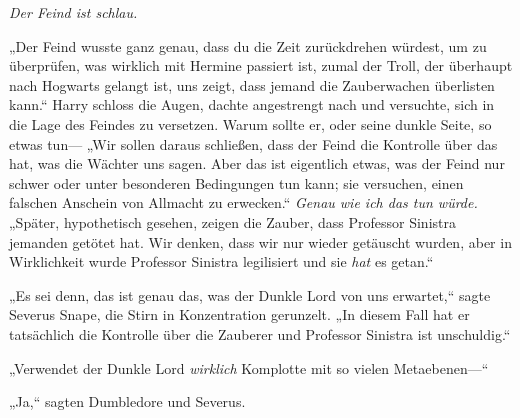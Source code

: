 \emph{Der Feind ist schlau.}

„Der Feind wusste ganz genau, dass du die Zeit zurückdrehen würdest, um zu überprüfen, was wirklich mit Hermine passiert ist, zumal der Troll, der überhaupt nach Hogwarts gelangt ist, uns zeigt, dass jemand die Zauberwachen überlisten kann.“ Harry schloss die Augen, dachte angestrengt nach und versuchte, sich in die Lage des Feindes zu versetzen.
Warum sollte er, oder seine dunkle Seite, so etwas tun—
„Wir sollen daraus schließen, dass der Feind die Kontrolle über das hat, was die Wächter uns sagen. Aber das ist eigentlich etwas, was der Feind nur schwer oder unter besonderen Bedingungen tun kann; sie versuchen, einen falschen Anschein von Allmacht zu erwecken.“
\emph{Genau wie ich das tun würde.}
„Später, hypothetisch gesehen, zeigen die Zauber, dass Professor Sinistra jemanden getötet hat. Wir denken, dass wir nur wieder getäuscht wurden, aber in Wirklichkeit wurde Professor Sinistra legilisiert und sie \emph{hat} es getan.“

„Es sei denn, das ist genau das, was der Dunkle Lord von uns erwartet,“ sagte Severus Snape, die Stirn in Konzentration gerunzelt. „In diesem Fall hat er tatsächlich die Kontrolle über die Zauberer und Professor Sinistra ist unschuldig.“

„Verwendet der Dunkle Lord \emph{wirklich} Komplotte mit so vielen Metaebenen—“

„Ja,“ sagten Dumbledore und Severus.

